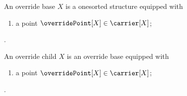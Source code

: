 \begin{struct}\label{override_base}
    An override base $X$ is a onesorted structure equipped with
    \begin{enumerate}
        \item\label{override_base_point}
            a point $\overridePoint[X]\in\carrier[X]$;
    \end{enumerate}
    .
\end{struct}

\begin{struct}\label{override_child}
    An override child $X$ is an override base equipped with
    \begin{enumerate}
        \item\label{override_child_point}
            a point $\overridePoint[X]\in\carrier[X]$;
    \end{enumerate}
    .
\end{struct}
